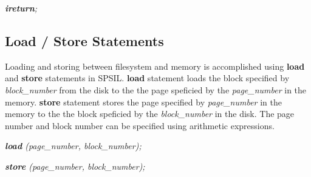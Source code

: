 \documentclass[11pt]{article}
\begin{document}
\textit{\textbf{ireturn};}


\subsection{Load / Store Statements}
Loading and storing between filesystem and memory is accomplished using \textbf{load} and \textbf{store} statements in SPSIL. \textbf{load} statement loads the block specified by \textit{block\_number} from the disk to the the page speficied by the \textit{page\_number} in the memory. \textbf{store} statement stores the page specified by \textit{page\_number} in the memory to the the block speficied by the \textit{block\_number} in the disk. The page number and block number can be specified using arithmetic expressions.

\textit{\textbf{load} (page\_number, block\_number);}

\textit{\textbf{store} (page\_number, block\_number);}
\end{document}
